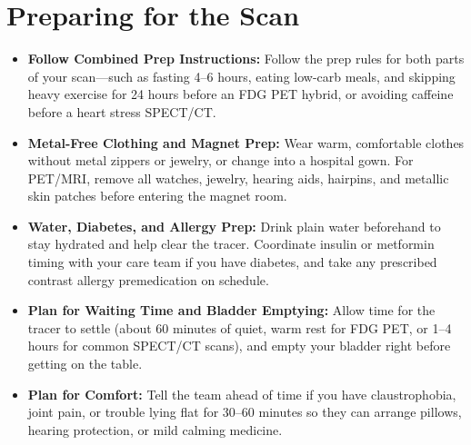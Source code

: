\section{Preparing for the Scan}
\begin{itemize}
    \item \textbf{Follow Combined Prep Instructions:} Follow the prep rules for both parts of your scan---such as fasting 4--6 hours, eating low-carb meals, and skipping heavy exercise for 24 hours before an FDG PET hybrid, or avoiding caffeine before a heart stress SPECT/CT.
    \item \textbf{Metal-Free Clothing and Magnet Prep:} Wear warm, comfortable clothes without metal zippers or jewelry, or change into a hospital gown. For PET/MRI, remove all watches, jewelry, hearing aids, hairpins, and metallic skin patches before entering the magnet room.
    \item \textbf{Water, Diabetes, and Allergy Prep:} Drink plain water beforehand to stay hydrated and help clear the tracer. Coordinate insulin or metformin timing with your care team if you have diabetes, and take any prescribed contrast allergy premedication on schedule.
    \item \textbf{Plan for Waiting Time and Bladder Emptying:} Allow time for the tracer to settle (about 60 minutes of quiet, warm rest for FDG PET, or 1--4 hours for common SPECT/CT scans), and empty your bladder right before getting on the table.
    \item \textbf{Plan for Comfort:} Tell the team ahead of time if you have claustrophobia, joint pain, or trouble lying flat for 30--60 minutes so they can arrange pillows, hearing protection, or mild calming medicine.
\end{itemize}

